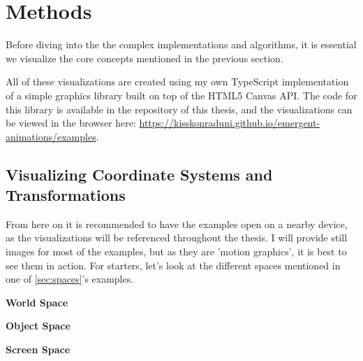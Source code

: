\section{Methods}
\label{sec:methods}

Before diving into the the complex implementations and algorithms, it is essential we visualize the core concepts mentioned in the previous section.

\begin{Note} 
    All of these visualizations are created using my own TypeScript implementation of a simple graphics library built on top of the HTML5 Canvas API. The code for this library is available in the repository of this thesis, and the visualizations can be viewed in the browser here: \url{https://kisskonraduni.github.io/emergent-animations/examples}.
\end{Note}

\subsection{Visualizing Coordinate Systems and Transformations}
\label{sec:visualizing-coordinate-systems}

From here on it is recommended to have the examples open on a nearby device, as the visualizations will be referenced throughout the thesis. I will provide still images for most of the examples, but as they are 'motion graphics', it is best to see them in action. For starters, let's look at the different spaces mentioned in one of \ref{sec:spaces}'s examples. 

\setlength{\columnsep}{1.5cm}
\setlength{\columnseprule}{0.4pt}

\begin{multicols}{3}
    
    \center\textbf{World Space}

\columnbreak

    \center\textbf{Object Space}

\columnbreak

    \center\textbf{Screen Space}

\end{multicols}

\pagebreak
